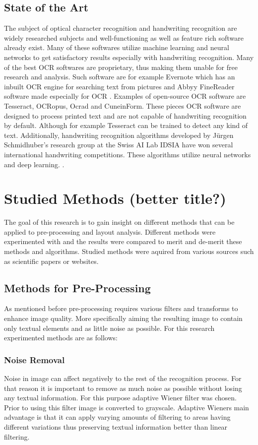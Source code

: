 \documentclass{article}
\begin{document}
    \subsection{State of the Art}
      The subject of optical character recognition and handwriting recognition are widely researched subjects and well-functioning as well as feature rich software already exist. Many of these softwares utilize machine learning and neural networks to get satisfactory results especially with handwriting recognition. Many of the best OCR softwares are proprietary, thus making them unable for free research and analysis. Such software are for example Evernote which has an inbuilt OCR engine for searching text from pictures \cite{Kelly} and Abbyy FineReader software made especially for OCR \cite{ABBYY}. Examples of open-source OCR software are Tesseract\cite{Smith2007a}, OCRopus\cite{Breuel2007}, Ocrad\cite{FreeSoftwareFoundation2016} and CuneinForm\cite{CognitiveTechnologies2016}. These pieces OCR software are designed to process printed text and are not capable of handwriting recognition by default. Although for example Tesseract can be trained to detect any kind of text.\cite{Smith2007a} Additionally, handwriting recognition algorithms developed by Jürgen Schmidhuber's research group at the Swiss AI Lab IDSIA have won several international handwriting competitions. These algorithms utilize neural networks and deep learning. \cite{Angelica}.


  \newpage
  \section{Studied Methods (better title?)}
    The goal of this research is to gain insight on different methods that can be applied to pre-processing and layout analysis. Different methods were experimented with and the results were compared to merit and de-merit these methods and algorithms. Studied methods were aquired from various sources such as scientific papers or websites.
    \subsection{Methods for Pre-Processing}
      As mentioned before pre-processing requires various filters and transforms to enhance image quality. More specifically aiming the resulting image to contain only textual elements and as little noise as possible. For this research experimented methods are as follows:

        \subsubsection{Noise Removal}
          Noise in image can affect negatively to the rest of the recognition process. For that reason it is important to remove as much noise as possible without losing any textual information. For this purpose adaptive Wiener filter was chosen. Prior to using this filter image is converted to grayscale. Adaptive Wieners main advantage is that it can apply varying amounts of filtering to areas having different variations thus preserving textual information better than linear filtering.\cite{TheMathWorksWiener}
\end{document}
